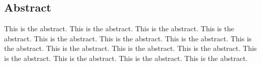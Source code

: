 \subsection*{Abstract}
This is the abstract. This is the abstract. This is the abstract. 
This is the abstract. This is the abstract. This is the abstract. 
This is the abstract. This is the abstract. This is the abstract. 
This is the abstract. This is the abstract. This is the abstract. 
This is the abstract. This is the abstract. This is the abstract. 
